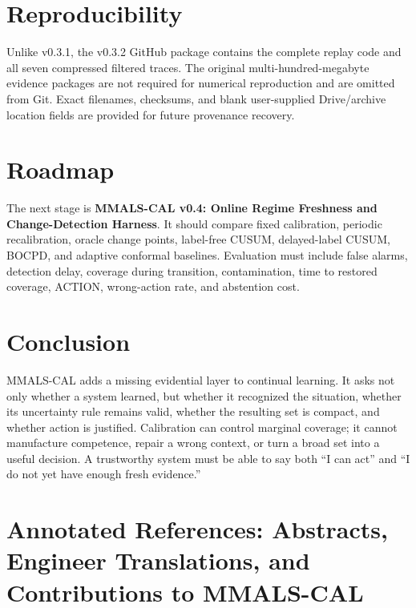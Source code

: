 \documentclass[10pt]{article}
\newcommand{\mmalscal}{\textsc{MMALS-CAL}}
\begin{document}
\section{Reproducibility}
Unlike v0.3.1, the v0.3.2 GitHub package contains the complete replay code and all seven compressed filtered traces. The original multi-hundred-megabyte evidence packages are not required for numerical reproduction and are omitted from Git. Exact filenames, checksums, and blank user-supplied Drive/archive location fields are provided for future provenance recovery.

\section{Roadmap}
The next stage is \textbf{MMALS-CAL v0.4: Online Regime Freshness and Change-Detection Harness}. It should compare fixed calibration, periodic recalibration, oracle change points, label-free CUSUM, delayed-label CUSUM, BOCPD, and adaptive conformal baselines. Evaluation must include false alarms, detection delay, coverage during transition, contamination, time to restored coverage, ACTION, wrong-action rate, and abstention cost.

\section{Conclusion}
\mmalscal{} adds a missing evidential layer to continual learning. It asks not only whether a system learned, but whether it recognized the situation, whether its uncertainty rule remains valid, whether the resulting set is compact, and whether action is justified. Calibration can control marginal coverage; it cannot manufacture competence, repair a wrong context, or turn a broad set into a useful decision. A trustworthy system must be able to say both ``I can act'' and ``I do not yet have enough fresh evidence.''

\clearpage
\section{Annotated References: Abstracts, Engineer Translations, and Contributions to MMALS-CAL}

\end{document}
